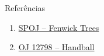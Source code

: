\begin{frame}[fragile]{Referências}

    \begin{enumerate}
        \item \href{https://www.spoj.com/problems/FENTREE/}{SPOJ -- Fenwick Trees}

        \item \href{https://onlinejudge.org/index.php?option=onlinejudge&page=show_problem&problem=4663}{OJ 12798 -- Handball}

    \end{enumerate}

\end{frame}

